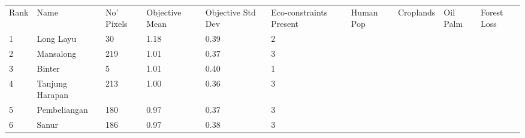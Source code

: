 \begin{table}[ht]
\centering
\begingroup\fontsize{9pt}{10pt}\selectfont
\begin{tabular}{C{0.05\textwidth}C{0.15\textwidth}C{0.08\textwidth}C{0.08\textwidth}C{0.08\textwidth}C{0.08\textwidth}C{0.08\textwidth}C{0.08\textwidth}C{0.08\textwidth}C{0.08\textwidth}}
 Rank & Name & No' Pixels & Objective Mean & Objective Std Dev & Eco-constraints  Present & Human Pop & Croplands & Oil Palm & Forest Loss \\ 
 {1} & Long Layu &  30 & \textcolor[HTML]{FFFFFF}{1.18} & \textcolor[HTML]{000000}{0.39} & \textcolor[HTML]{000000}{2} &  &  &  &  \\ 
  {2} & Mansalong & 219 & \textcolor[HTML]{FFFFFF}{1.01} & \textcolor[HTML]{000000}{0.37} & \textcolor[HTML]{000000}{3} &  &  &  &  \\ 
  {3} & Binter &   5 & \textcolor[HTML]{FFFFFF}{1.01} & \textcolor[HTML]{000000}{0.40} & \textcolor[HTML]{000000}{1} &  &  &  &  \\ 
  {4} & Tanjung Harapan & 213 & \textcolor[HTML]{FFFFFF}{1.00} & \textcolor[HTML]{000000}{0.36} & \textcolor[HTML]{000000}{3} &  &  &  &  \\ 
  {5} & Pembeliangan & 180 & \textcolor[HTML]{FFFFFF}{0.97} & \textcolor[HTML]{000000}{0.37} & \textcolor[HTML]{000000}{3} &  &  &  &  \\ 
  {6} & Sanur & 186 & \textcolor[HTML]{FFFFFF}{0.97} & \textcolor[HTML]{000000}{0.38} & \textcolor[HTML]{000000}{3} &  &  &  &  \\ 

\end{tabular}
\end{table}
